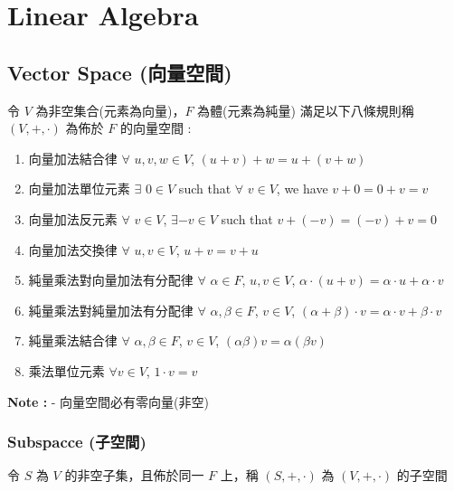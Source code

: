 \documentclass[
]{book}
\providecommand{\tightlist}{%
  \setlength{\itemsep}{0pt}\setlength{\parskip}{0pt}}
\begin{document}
\hypertarget{linear-algebra}{%
\chapter{Linear Algebra}\label{linear-algebra}}

\hypertarget{vector-space-ux5411ux91cfux7a7aux9593}{%
\section{Vector Space (向量空間)}\label{vector-space-ux5411ux91cfux7a7aux9593}}

令 \(V\) 為非空集合(元素為向量)，\(F\) 為體(元素為純量)
滿足以下八條規則稱 \((V,+,\cdot)\) 為佈於 \(F\) 的向量空間 :

\begin{enumerate}
\def\labelenumi{\arabic{enumi}.}
\tightlist
\item
  向量加法結合律
  \(\forall\) \(u,v,w \in V\), \((u + v) + w = u + (v + w)\)
\item
  向量加法單位元素
  \(\exists\) \(0 \in V\) such that \(\forall\) \(v \in V\), we have \(v+0 = 0+v = v\)
\item
  向量加法反元素
  \(\forall\) \(v \in V\), \(\exists -v \in V\) such that \(v + (-v) = (-v) + v = 0\)
\item
  向量加法交換律
  \(\forall\) \(u,v \in V\), \(u+v = v+u\)
\item
  純量乘法對向量加法有分配律
  \(\forall\) \(\alpha \in F\), \(u,v \in V\), \(\alpha \cdot(u+v) = \alpha \cdot u + \alpha \cdot v\)
\item
  純量乘法對純量加法有分配律
  \(\forall\) \(\alpha, \beta \in F\), \(v \in V\), \((\alpha + \beta) \cdot v = \alpha \cdot v + \beta \cdot v\)
\item
  純量乘法結合律
  \(\forall\) \(\alpha, \beta \in F\), \(v \in V\), \((\alpha\beta) v = \alpha(\beta v)\)
\item
  乘法單位元素
  \(\forall v \in V\), \(1 \cdot v = v\)
\end{enumerate}

\textbf{Note :}
- 向量空間必有零向量(非空)

\hypertarget{subspacce-ux5b50ux7a7aux9593}{%
\subsection{Subspacce (子空間)}\label{subspacce-ux5b50ux7a7aux9593}}

令 \(S\) 為 \(V\) 的非空子集，且佈於同一 \(F\) 上，稱 \((S,+, \cdot)\) 為 \((V,+,\cdot)\) 的子空間
\end{document}
